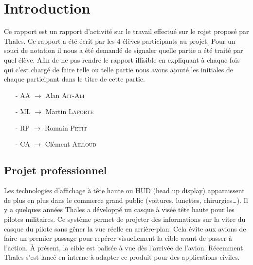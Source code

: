 
\chapter{Introduction} %

\label{Chapter1} %


\color{red}

Ce rapport est un rapport d’activité sur le travail effectué sur le rojet proposé par Thales. Ce
rapport a été écrit par les 4 élèves participants au projet. Pour un souci de notation il nous a été
demandé de signaler quelle partie a été traité par quel élève. Afin de ne pas rendre le rapport
illisible en expliquant à chaque fois qui c’est chargé de faire telle ou telle partie nous avons ajouté
les initiales de chaque participant dans le titre de cette partie.

\begin{itemize}
    \item[-] AA $\rightarrow$ Alan \textsc{Ait-Ali}
    \item[-] ML $\rightarrow$ Martin \textsc{Laporte}
    \item[-] RP $\rightarrow$ Romain \textsc{Petit}
    \item[-] CA $\rightarrow$ Clément \textsc{Ailloud}
\end{itemize}

\color{black}

\section{Projet professionnel}

Les technologies d’affichage à tête haute ou HUD (head up display) apparaissent de plus en plus dans le
commerce grand public (voitures, lunettes, chirurgies…). Il y a quelques années Thales a développé un
casque à visée tête haute pour les pilotes militaires. Ce système permet de projeter des informations
sur la vitre du casque du pilote sans gêner la vue réelle en arrière-plan. Cela évite aux avions de 
faire un premier passage pour repérer visuellement la cible avant de passer à l’action. À présent, la
cible est balisée à vue dès l’arrivée de l’avion. Récemment Thales s’est lancé en interne à adapter 
ce produit pour des applications civiles. \medskip

